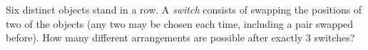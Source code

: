 Six distinct objects stand in a row. A \emph{switch} consists of swapping the positions of two of the objects (any two may be chosen each time, including a pair swapped before). How many different arrangements are possible after exactly \(3\) switches?
